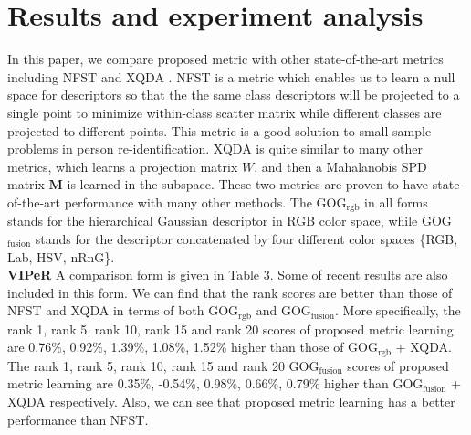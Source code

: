 \section{Results and experiment analysis}
In this paper, we compare proposed metric with other state-of-the-art metrics including NFST \cite{NFST} and XQDA \cite{LOMO}. NFST is a metric which enables us to learn a null space for descriptors so that the the same class descriptors will be projected to a single point to minimize within-class scatter matrix while different classes are projected to different points. This metric is a good solution to small sample problems in person re-identification. XQDA is quite similar to many other metrics, which learns a projection matrix $W$, and then a Mahalanobis SPD matrix $\bm{M}$ is learned in the subspace. These two metrics are proven to have state-of-the-art performance with many other methods. The GOG$_\text{rgb}$ in all forms stands for the hierarchical Gaussian descriptor in RGB color space, while GOG$_\text{fusion}$ stands for the descriptor concatenated by four different color spaces \{RGB, Lab, HSV, nRnG\}.\\
\textbf{VIPeR} A comparison form is given in Table 3. Some of recent results are also included in this form. We can find that the rank scores are better than those of NFST and XQDA in terms of both GOG$_\text{rgb}$ and GOG$_\text{fusion}$. More specifically, the rank 1, rank 5, rank 10, rank 15 and rank 20 scores of proposed metric learning are 0.76\%, 0.92\%, 1.39\%, 1.08\%, 1.52\% higher than those of GOG$_\text{rgb}$ + XQDA. The rank 1, rank 5, rank 10, rank 15 and rank 20 GOG$_\text{fusion}$ scores of proposed metric learning are 0.35\%, -0.54\%, 0.98\%, 0.66\%, 0.79\% higher than GOG$_\text{fusion}$ + XQDA respectively. Also, we can see that proposed metric learning has a better performance than NFST. \newline 
